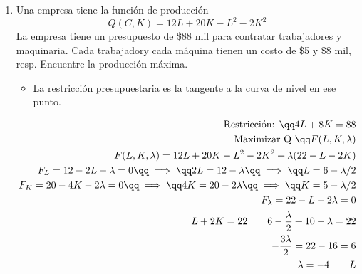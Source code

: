 \begin{enumerate}
    \item Una empresa tiene la función de producción 
    \[
        Q(C,K) = 12L+20K-L^2-2K^2   
    \] 
    La empresa tiene un presupuesto de \$88 mil para contratar trabajadores y maquinaria. Cada trabajadory cada máquina tienen un costo de \$5 y \$8 mil, resp. \newline Encuentre la producción máxima.
    \begin{center}
        \begin{itemize}[label=\#]
            \item La restricción presupuestaria es la tangente a la curva de nivel en ese punto.
        \end{itemize}
       \begin{align*}
            \text{ Restricción:  } \qq 4L +8K = 88 \\ 
            \text{ Maximizar Q } \qq F(L,K,\lambda) \\ 
            F(L,K,\lambda) = 12L+20K-L^2-2K^2+\lambda(22-L-2K) \\ 
            F_L = 12-2L-\lambda = 0 \qq \implies \qq 2L = 12-\lambda \qq \implies \qq L = 6 - \lambda/2 \\ 
            F_K = 20-4K-2\lambda = 0 \qq \implies \qq 4K = 20-2\lambda \qq \implies \qq K = 5 - \lambda/2 \\ 
            F_\lambda = 22-L-2\lambda = 0\\
            L+2K=22 \qquad 6-\frac{\lambda}{2} +10-\lambda = 22 \\ 
            -\frac{3\lambda}{2}  = 22-16 = 6 \\ 
            \lambda=-4 \qquad L  
       \end{align*}
    \end{center}
\end{enumerate}
